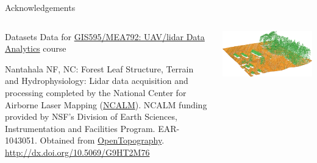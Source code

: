 \documentclass[xcolor={dvipsnames,usenames},beamer,aspectratio=169]{beamer}
\begin{document}
\begin{frame}{Acknowledgements}

\begin{columns}
\begin{column}{0.5\textwidth}

\begin{block}{Datasets}
\footnotesize
Data for
\href{http://ncsu-osgeorel.github.io/uav-lidar-analytics-course/}%
  {GIS595/MEA792: UAV/lidar Data Analytics} course

\smallskip

Nantahala NF, NC: Forest Leaf Structure, Terrain and Hydrophysiology:
Lidar data acquisition and processing completed
by the National Center for Airborne Laser Mapping (\href{http://www.ncalm.org}{NCALM}).
NCALM funding provided by NSF's Division of Earth Sciences, Instrumentation and Facilities Program.
EAR-1043051.
Obtained from \href{http://www.opentopography.org/}{OpenTopography}.
\url{http://dx.doi.org/10.5069/G9HT2M76}
\end{block}

\end{column}
\begin{column}{0.4\textwidth}

\begin{center}
  \includegraphics[width=\textwidth]{lidar_secref_3d}
\end{center}

\end{column}
\end{columns}

\end{frame}
\end{document}
